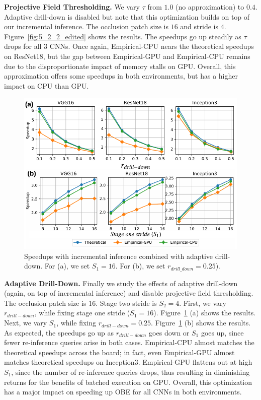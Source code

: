 \vspace{2mm}
\noindent \textbf{Projective Field Thresholding.} We vary $\tau$ from $1.0$ (no approximation) to $0.4$. Adaptive drill-down is disabled but note that this optimization builds on top of our incremental inference. The occlusion patch size is $16$ and stride is $4$. Figure~\ref{fig:5_2_2_edited} shows the results. The speedups go up steadily as $\tau$ drops for all 3 CNNs. Once again, Empirical-CPU nears the theoretical speedups on ResNet18, but the gap between Empirical-GPU and Empirical-CPU remains due to the disproportionate impact of memory stalls on GPU. Overall, this approximation offers some speedups in both environments, but has a higher impact on CPU than GPU.

\begin{figure}[t]
\includegraphics[width=\columnwidth]{images/5_2_3_edited}
\vspace{-8mm}
\caption{Speedups with incremental inference combined with adaptive drill-down. For (a), we set $S_1=16$. For (b), we set $r_{drill\_down}=0.25$).}
\vspace{-2mm}
\label{fig:5_2_3_edited}
\end{figure}

\vspace{2mm}
\noindent \textbf{Adaptive Drill-Down.} Finally we study the effects of adaptive drill-down (again, on top of incremental inference) and disable projective field thresholding. The occlusion patch size is $16$. Stage two stride is $S_2 = 4$. First, we vary $r_{drill-down}$, while fixing stage one stride ($S_1 = 16$). Figure~\ref{fig:5_2_3_edited} (a) shows the results. Next, we vary $S_1$, while fixing $r_{drill-down} = 0.25$. Figure~\ref{fig:5_2_3_edited} (b) shows the results. As expected, the speedups go up as $r_{drill-down}$ goes down or $S_1$ goes up, since fewer re-inference queries arise in both cases. Empirical-CPU almost matches the theoretical speedups across the board; in fact, even Empirical-GPU almost matches theoretical speedups on Inception3. Empirical-GPU flattens out at high $S_1$, since the number of re-inference queries drops, thus resulting in diminishing returns for the benefits of batched execution on GPU. Overall, this optimization has a major impact on speeding up OBE for all CNNs in both environments.


